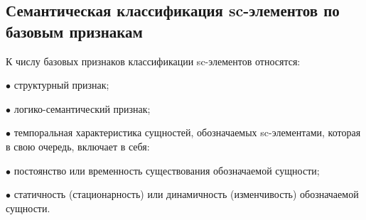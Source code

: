 \subsection{Семантическая классификация sc-элементов по базовым признакам}
К числу базовых признаков классификации sc-элементов относятся:
\begin{textitemize}
	\item[$\bullet$] структурный признак;
	\item[$\bullet$] логико-семантический признак;
	\item[$\bullet$] темпоральная характеристика сущностей, обозначаемых sc-элементами, которая в свою очередь, включает в себя:
	\begin{textitemize}
		\item[$\bullet$] постоянство или временность существования обозначаемой сущности;
		\item[$\bullet$] статичность (стационарность) или динамичность (изменчивость) обозначаемой сущности.
	\end{textitemize}
\end{textitemize}

